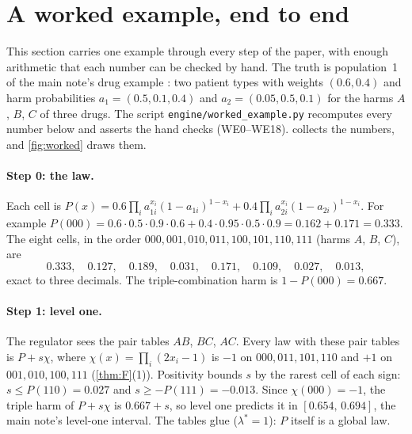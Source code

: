 \documentclass[11pt]{article}
\theoremstyle{definition}\newtheorem{definition}{Definition}\newtheorem{remark}{Remark}
\begin{document}
\section{A worked example, end to end}\label{sec:example}
This section carries one example through every step of the paper, with enough arithmetic that each number can be checked by hand. The
truth is population~1 of the main note's drug example \cite[Example ``conflicting pair trials'']{PG}: two patient types with weights
$(0.6,0.4)$ and harm probabilities $a_1=(0.5,0.1,0.4)$ and $a_2=(0.05,0.5,0.1)$ for the harms $A$, $B$, $C$ of three drugs. The script
\texttt{engine/worked\_example.py} recomputes every number below and asserts the hand checks (WE0--WE18).  collects
the numbers, and \cref{fig:worked} draws them.

\paragraph{Step 0: the law.} Each cell is $P(x)=0.6\prod_i a_{1i}^{x_i}(1-a_{1i})^{1-x_i}+0.4\prod_i a_{2i}^{x_i}(1-a_{2i})^{1-x_i}$. For
example $P(000)=0.6\cdot0.5\cdot0.9\cdot0.6+0.4\cdot0.95\cdot0.5\cdot0.9=0.162+0.171=0.333$. The eight cells, in the order
$000,001,010,011,100,101,110,111$ (harms $A$, $B$, $C$), are
\[
0.333,\quad0.127,\quad0.189,\quad0.031,\quad0.171,\quad0.109,\quad0.027,\quad0.013 ,
\]
exact to three decimals. The triple-combination harm is $1-P(000)=0.667$.

\paragraph{Step 1: level one.} The regulator sees the pair tables $AB$, $BC$, $AC$. Every law with these pair tables is $P+s\chi$, where
$\chi(x)=\prod_i(2x_i-1)$ is $-1$ on $000,011,101,110$ and $+1$ on $001,010,100,111$ (\cref{thm:F}(1)). Positivity bounds $s$ by the
rarest cell of each sign: $s\le P(110)=0.027$ and $s\ge-P(111)=-0.013$. Since $\chi(000)=-1$, the triple harm of $P+s\chi$ is $0.667+s$,
so level one predicts it in $[0.654,\,0.694]$, the main note's level-one interval. The tables glue ($\lambda^*=1$): $P$ itself is a global
law.
\end{document}
